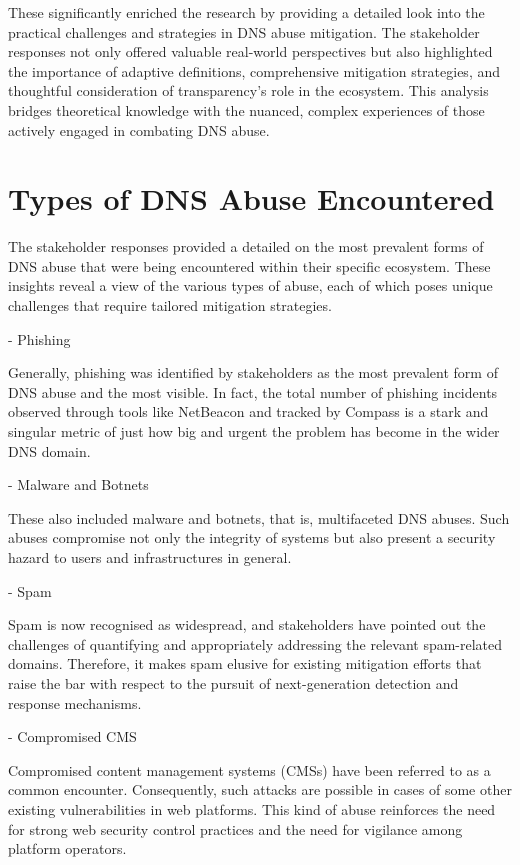  These significantly enriched the research by providing a detailed look into the practical challenges and strategies in DNS abuse mitigation. The stakeholder responses not only offered valuable real-world perspectives but also highlighted the importance of adaptive definitions, comprehensive mitigation strategies, and thoughtful consideration of transparency's role in the ecosystem. This analysis bridges theoretical knowledge with the nuanced, complex experiences of those actively engaged in combating DNS abuse.

\section{Types of DNS Abuse Encountered} 

The stakeholder responses provided a detailed on the most prevalent forms of DNS abuse that were being encountered within their specific ecosystem. These insights reveal a view of the various types of abuse, each of which poses unique challenges that require tailored mitigation strategies.

- Phishing 

Generally, phishing was identified by stakeholders as the most prevalent form of DNS abuse and the most visible. In fact, the total number of phishing incidents observed through tools like NetBeacon and tracked by Compass is a stark and singular metric of just how big and urgent the problem has become in the wider DNS domain.

- Malware and Botnets

These also included malware and botnets, that is, multifaceted DNS abuses. Such abuses compromise not only the integrity of systems but also present a security hazard to users and infrastructures in general.

- Spam

Spam is now recognised as widespread, and stakeholders have pointed out the challenges of quantifying and appropriately addressing the relevant spam-related domains. Therefore, it makes spam elusive for existing mitigation efforts that raise the bar with respect to the pursuit of next-generation detection and response mechanisms.

- Compromised CMS

Compromised content management systems (CMSs) have been referred to as a common encounter. Consequently, such attacks are possible in cases of some other existing vulnerabilities in web platforms. This kind of abuse reinforces the need for strong web security control practices and the need for vigilance among platform operators.


